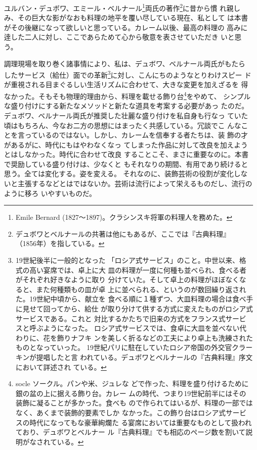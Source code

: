 ユルバン・デュボワ、エミール・ベルナール\footnote{Emile Bernard
  (1827〜1897)。クラシンスキ将軍の料理人を務めた。}両氏の著作\footnote{デュボワとベルナールの共著は他にもあるが、ここでは『古典料理』
  （1856年）を指している。}に昔から慣
れ親しみ、その巨大な影がなおも料理の地平を覆い尽している現在、私として
は本書がその後継になって欲しいと思っている。カレーム以後、最高の料理の
高みに逹した二人に対し、ここであらためて心から敬意を表させていただき
いと思う。

調理現場を取り巻く諸事情により、私は、デュボワ、ベルナール両氏がもたら
したサービス（給仕）面での革新\footnote{\protect\hypertarget{service-russe}{19世紀後半に一般的となった
  「ロシア式サービス」のこと。中世以来、格式の高い宴席では、卓上に大
  皿の料理が一度に何種も並べられ、食べる者がそれぞれ好きなように取り
  分けていた。そして卓上の料理がほぼなくなると、また何種類もの皿が卓
  上に並べられる、というのが数回繰り返された。19世紀中頃から、献立を
  食べる順に１種ずつ、大皿料理の場合は食べ手に見せて回ってから、給仕
  が取り分けて供する方式に変えたものがロシア式サービスである。これと
  対比するかたちで旧来の方式をフランス式サービスと呼ぶようになった。
  ロシア式サービスでは、食卓に大皿を並べない代わりに、花を飾りナフキ
  ンを美しく折るなどの工夫により卓上も洗練されたものとなっていった。
  19世紀パリに駐在していたロシア帝国の外交官クラーキンが提唱したと言
  われている。デュボワとベルナールの『古典料理』序文において詳述され
  ている。}}に対し、こんにちのようなとりわけスピー
ドが重視される目まぐるしい生活リズムに合わせて、大きな変更を加えざるを
得なかった。そもそも物理的理由から、料理を載せる飾り台\footnote{\protect\hypertarget{socle}{socle ソークル。パンや米、ジュレな
  どで作った、料理を盛り付けるために銀の盆の上に据える飾り台。カレー
  ムの時代、つまり19世紀前半にはその装飾に凝ることが多かった。食べも
  ので作られてはいるが、料理の一部ではなく、あくまで装飾的要素でしか
  なかった。この飾り台はロシア式サービスの時代になってもな豪華絢爛た
  る宴席においては重要なものとして扱われており、デュボワとベ}ルナー
  ル『古典料理』でも相応のページ数を割いて説明がなされている。}をやめて、
シンプルな盛り付けにする新たなメソッドと新たな道具を考案する必要があっ
たのだ。デュボワ、ベルナール両氏が推奨した壮麗な盛り付けを私自身も行なっ
ていた頃はもちろん、今なお二方の思想にはまったく共感している。冗談でこ
んなことを言っているのではない。しかし、カレームを信奉する者たちは、装
飾の才があるがに、時代にもはやわなくなっ
てしまった作品に対して改良を加えようとはしなかった。時代に合わせて改良
することこそ、まさに重要なのに。本書で奨励している盛り付けは、少なくと
もそれなりの期間、有用であり続けると思う。全ては変化する。姿を変える。
それなのに、装飾芸術の役割が変化しないと主張するなどとはではないか。芸術は流行によって栄えるものだし、流行のように移ろ
いやすいものだ。

